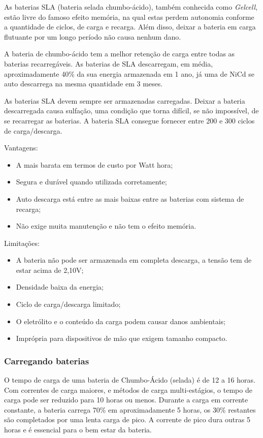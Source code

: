 As baterias SLA (bateria selada chumbo-ácido), também conhecida como \textit{Gelcell}, estão livre do famoso efeito memória, na qual estas perdem autonomia conforme a quantidade de ciclos, de carga e recarga. Além disso, deixar a bateria em carga flutuante por um longo período não causa nenhum dano.

A bateria de chumbo-ácido tem a melhor retenção de carga entre todas as baterias recarregáveis. As baterias de SLA descarregam, em média, aproximadamente 40\% da sua energia armazenada em 1 ano, já uma de NiCd se auto descarrega na mesma quantidade em 3 meses.

As baterias SLA devem sempre ser armazenadas carregadas. Deixar a bateria descarregada causa sulfação, uma condição que torna difícil, se não impossível, de se recarregar as baterias. A bateria SLA consegue fornecer entre 200 e 300 ciclos de carga/descarga.

Vantagens:

\begin{itemize}
	\item A mais barata em termos de custo por Watt hora;
	\item Segura e durável quando utilizada corretamente;
	\item Auto descarga está entre as mais baixas entre as baterias com sistema de recarga;
	\item Não exige muita manutenção e não tem o efeito memória.
\end{itemize}

Limitações:

\begin{itemize}
	\item A bateria não pode ser armazenada em completa descarga, a tensão tem de estar acima de 2,10V;
	\item Densidade baixa da energia;
	\item Ciclo de carga/descarga limitado;
	\item O eletrólito e o conteúdo da carga podem causar danos ambientais;
	\item Imprópria para dispositivos de mão que exigem tamanho compacto.
\end{itemize}

\subsubsection{Carregando baterias}

O tempo de carga de uma bateria de Chumbo-Ácido (selada) é de 12 a 16 horas. Com correntes de carga maiores, e métodos de carga multi-estágios, o tempo de carga pode ser reduzido para 10 horas ou menos. Durante a carga em corrente constante, a bateria carrega 70\% em aproximadamente 5 horas, os 30\% restantes são completados por uma lenta carga de pico. A corrente de pico dura outras 5 horas e é essencial para o bem estar da bateria.

